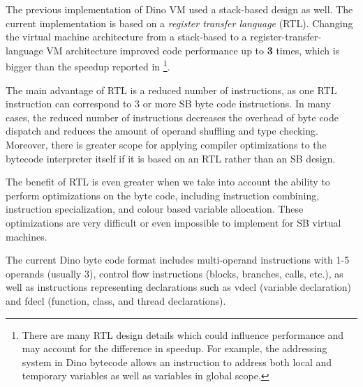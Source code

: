 \documentclass[preprint]{sigplanconf}
\begin{document}
The previous implementation of Dino VM used a stack-based design as well.
The current implementation is based on a \emph{register transfer
  language} (RTL).  Changing the virtual machine architecture from a stack-based to
a register-transfer-language VM architecture improved code
performance up to \textbf{3} times,
which is bigger than the speedup reported
in \cite{Shi}\footnote{There are many RTL design details
  which could influence performance    
  and may account for the difference in speedup.
  For example, the addressing system in Dino bytecode
  allows an instruction to address both local and temporary variables as well as
  variables in global scope.}.
  
  The main advantage of RTL is a reduced number of instructions, as one RTL instruction can correspond to 3 or more SB
byte code instructions. In many cases, the reduced number of instructions decreases 
the overhead of byte code dispatch and reduces the amount of operand shuffling and
type checking. Moreover, there is greater scope for 
applying compiler optimizations to the bytecode interpreter itself
if it is based on an RTL rather than an SB design.

  The benefit of RTL is even greater when we take into account the ability to
perform optimizations on the byte code, including instruction combining, instruction specialization, and colour based variable allocation. These optimizations are
very difficult or even impossible to implement for SB virtual machines.

  The current Dino byte code format includes multi-operand instructions
with 1-5 operands (usually 3), control flow instructions (blocks, branches, calls, etc.),
as well as instructions representing declarations such as vdecl (variable declaration)
and fdecl (function, class, and thread declarations).
\end{document}
